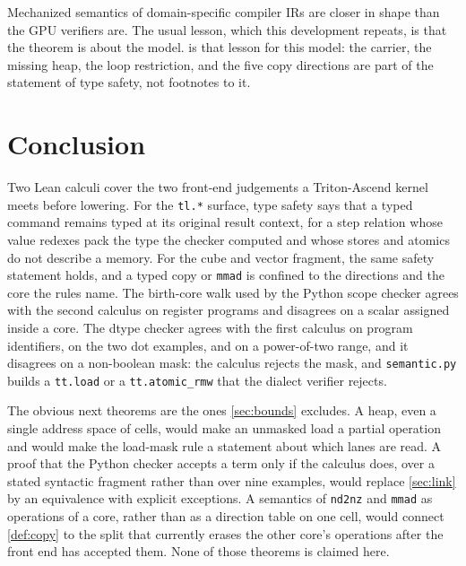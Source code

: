 \documentclass[a4paper,UKenglish,anonymous,cleveref,autoref]{lipics-v2021}
\begin{document}
Mechanized semantics of domain-specific compiler IRs are closer in shape than the GPU verifiers are.
The usual lesson, which this development repeats, is that the theorem is about the model.
 is that lesson for this model: the carrier, the missing heap, the loop restriction, and the five copy directions are part of the statement of type safety, not footnotes to it.

\section{Conclusion}
\label{sec:conc}

Two Lean calculi cover the two front-end judgements a Triton-Ascend kernel meets before lowering.
For the \texttt{tl.*} surface, type safety says that a typed command remains typed at its original result context, for a step relation whose value redexes pack the type the checker computed and whose stores and atomics do not describe a memory.
For the cube and vector fragment, the same safety statement holds, and a typed copy or \texttt{mmad} is confined to the directions and the core the rules name.
The birth-core walk used by the Python scope checker agrees with the second calculus on register programs and disagrees on a scalar assigned inside a core.
The dtype checker agrees with the first calculus on program identifiers, on the two dot examples, and on a power-of-two range, and it disagrees on a non-boolean mask: the calculus rejects the mask, and \texttt{semantic.py} builds a \texttt{tt.load} or a \texttt{tt.atomic\_rmw} that the dialect verifier rejects.

The obvious next theorems are the ones \cref{sec:bounds} excludes.
A heap, even a single address space of cells, would make an unmasked load a partial operation and would make the load-mask rule a statement about which lanes are read.
A proof that the Python checker accepts a term only if the calculus does, over a stated syntactic fragment rather than over nine examples, would replace \cref{sec:link} by an equivalence with explicit exceptions.
A semantics of \texttt{nd2nz} and \texttt{mmad} as operations of a core, rather than as a direction table on one cell, would connect \cref{def:copy} to the split that currently erases the other core's operations after the front end has accepted them.
None of those theorems is claimed here.


\end{document}
